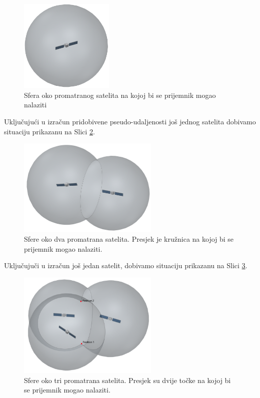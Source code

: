 \documentclass[a4paper,twoside,12pt]{memoir} %
\begin{document}
	\begin{figure}[H]
		\centering
		\includegraphics[width=0.4\textwidth]{satellite_distance_13D}
		\caption{Sfera oko promatranog satelita na kojoj bi se prijemnik mogao nalaziti \cite{gps:2}}
		\label{Fig:1SatelitePosition}
	\end{figure}
	Uključujući u izračun pridobivene pseudo-udaljenosti još jednog satelita dobivamo situaciju prikazanu na Slici \ref{Fig:2SatelitePosition}.
	\begin{figure}[H]
		\centering
		\includegraphics[width=0.6\textwidth]{satellites_distance_23D}
		\caption{Sfere oko dva promatrana satelita. Presjek je kružnica na kojoj bi se prijemnik mogao nalaziti. \cite{gps:2}}
		\label{Fig:2SatelitePosition}
	\end{figure}
	Uključujuči u izračun još jedan satelit, dobivamo situaciju prikazanu na Slici \ref{Fig:3SatelitePosition}.
	
	\begin{figure}[H]
		\centering
		\includegraphics[width=0.6\textwidth]{satellites_distance_33D}
		\caption{Sfere oko tri promatrana satelita. Presjek su dvije točke na kojoj bi se prijemnik mogao nalaziti. \cite{gps:2}}
		\label{Fig:3SatelitePosition}
	\end{figure}
	
\end{document}
